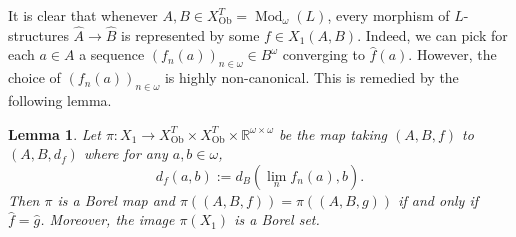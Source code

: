 \documentclass[12pt]{amsart}
\newtheorem{lemma}[theorem]{Lemma}
\DeclareMathOperator{\Mod}{Mod}
\DeclareMathOperator{\Ob}{Ob}
\newcommand{\theory}{T}
\begin{document}
It is clear that whenever $A,B\in X_{\Ob}^{\theory}=\Mod_\omega(L)$, every morphism of $L$-structures $\widehat{A}\to\widehat{B}$ is represented by some $f\in X_1(A,B)$. Indeed, we can pick for each $a\in A$ a sequence $(f_n(a))_{n\in\omega}\in B^\omega$ converging to $\widehat{f}(a)$. However, the choice of $(f_n(a))_{n\in\omega}$ is highly non-canonical. 
This is remedied by the following lemma.

\begin{lemma}\label{lemma:Borel_cat_of_L_structures}
    Let $\pi \colon X_1\to X^{\theory}_{\Ob}\times X^{\theory}_{\Ob} \times \mathbb{R}^{\omega \times \omega}$ be the map taking $(A,B,f)$ to $(A,B,d_f)$ where for any $a,b\in\omega$,
    \[d_f(a,b):=d_B(\lim_n f_n(a),b).\]
    Then $\pi$ is a Borel map and $\pi((A,B,f))=\pi((A,B,g))$ if and only if $\widehat{f}=\widehat{g}$. Moreover, the image $\pi(X_1)$ is a Borel set.
\end{lemma}
\end{document}
